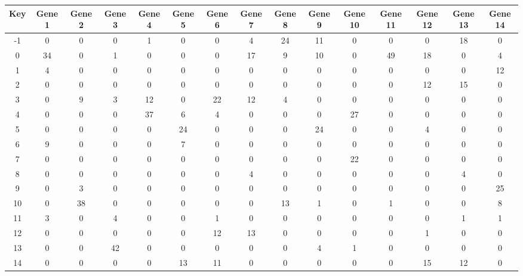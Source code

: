 \begin{tabular}{|c|c|c|c|c|c|c|c|c|c|c|c|c|c|c|}
\hline
Key & Gene 1 & Gene 2 & Gene 3 & Gene 4 & Gene 5 & Gene 6 & Gene 7 & Gene 8 & Gene 9 & Gene 10 & Gene 11 & Gene 12 & Gene 13 & Gene 14 \\
\hline
-1 & 0 & 0 & 0 & 1 & 0 & 0 & 4 & 24 & 11 & 0 & 0 & 0 & 18 & 0 \\
0 & 34 & 0 & 1 & 0 & 0 & 0 & 17 & 9 & 10 & 0 & 49 & 18 & 0 & 4 \\
1 & 4 & 0 & 0 & 0 & 0 & 0 & 0 & 0 & 0 & 0 & 0 & 0 & 0 & 12 \\
2 & 0 & 0 & 0 & 0 & 0 & 0 & 0 & 0 & 0 & 0 & 0 & 12 & 15 & 0 \\
3 & 0 & 9 & 3 & 12 & 0 & 22 & 12 & 4 & 0 & 0 & 0 & 0 & 0 & 0 \\
4 & 0 & 0 & 0 & 37 & 6 & 4 & 0 & 0 & 0 & 27 & 0 & 0 & 0 & 0 \\
5 & 0 & 0 & 0 & 0 & 24 & 0 & 0 & 0 & 24 & 0 & 0 & 4 & 0 & 0 \\
6 & 9 & 0 & 0 & 0 & 7 & 0 & 0 & 0 & 0 & 0 & 0 & 0 & 0 & 0 \\
7 & 0 & 0 & 0 & 0 & 0 & 0 & 0 & 0 & 0 & 22 & 0 & 0 & 0 & 0 \\
8 & 0 & 0 & 0 & 0 & 0 & 0 & 4 & 0 & 0 & 0 & 0 & 0 & 4 & 0 \\
9 & 0 & 3 & 0 & 0 & 0 & 0 & 0 & 0 & 0 & 0 & 0 & 0 & 0 & 25 \\
10 & 0 & 38 & 0 & 0 & 0 & 0 & 0 & 13 & 1 & 0 & 1 & 0 & 0 & 8 \\
11 & 3 & 0 & 4 & 0 & 0 & 1 & 0 & 0 & 0 & 0 & 0 & 0 & 1 & 1 \\
12 & 0 & 0 & 0 & 0 & 0 & 12 & 13 & 0 & 0 & 0 & 0 & 1 & 0 & 0 \\
13 & 0 & 0 & 42 & 0 & 0 & 0 & 0 & 0 & 4 & 1 & 0 & 0 & 0 & 0 \\
14 & 0 & 0 & 0 & 0 & 13 & 11 & 0 & 0 & 0 & 0 & 0 & 15 & 12 & 0 \\
\hline
\end{tabular}